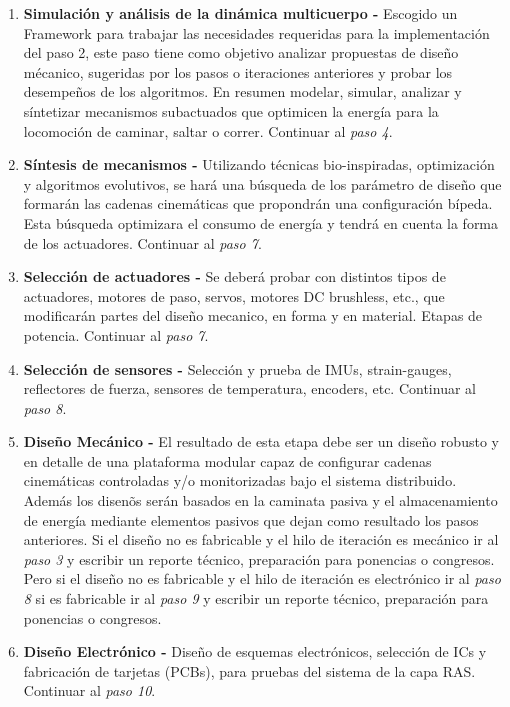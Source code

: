 {\begin{enumerate}
  \item \textbf{Simulaci\'on y an\'alisis de la din\'amica multicuerpo - } Escogido un Framework para trabajar las necesidades requeridas para la implementaci\'on del paso 2, este paso tiene como objetivo analizar propuestas de dise\~no m\'ecanico, sugeridas por los pasos o iteraciones anteriores y probar los desempe\~nos de los algoritmos. En resumen modelar, simular, analizar y s\'intetizar mecanismos subactuados que optimicen la energ\'ia para la locomoci\'on de caminar, saltar o correr. Continuar al \emph{paso 4}.\par
  \item \textbf{S\'intesis de mecanismos - } Utilizando t\'ecnicas bio-inspiradas, optimizaci\'on y algoritmos evolutivos, se har\'a una b\'usqueda de los parámetro de dise\~no que formar\'an las cadenas cinem\'aticas que propondrán una configuraci\'on b\'ipeda. Esta búsqueda optimizara el consumo de energ\'ia y tendrá en cuenta la forma de los actuadores. Continuar al \emph{paso 7}.\par
  \item \textbf{Selecci\'on de actuadores - } Se deber\'a probar con distintos tipos de actuadores, motores de paso, servos, motores DC brushless, etc., que modificar\'an partes del dise\~no mecanico, en forma y en material. Etapas de potencia. Continuar al \emph{paso 7}.\par
  \item \textbf{Selecci\'on de sensores - } Selecci\'on y prueba de IMUs, strain-gauges, reflectores de fuerza, sensores de temperatura, encoders, etc. Continuar al \emph{paso 8}.\par
  \item \textbf{Dise\~no Mec\'anico - } El resultado de esta etapa debe ser un dise\~no robusto y en detalle de una plataforma modular capaz de configurar cadenas cinem\'aticas controladas y/o monitorizadas bajo el sistema distribuido. Adem\'as los disen\~os ser\'an basados en la caminata pasiva y el almacenamiento de energ\'ia mediante elementos pasivos que dejan como resultado los pasos anteriores. Si el dise\~no no es fabricable y el hilo de iteraci\'on es mec\'anico ir al \emph{paso 3} y escribir un reporte t\'ecnico, preparaci\'on para ponencias o congresos. Pero si el dise\~no no es fabricable y el hilo de iteraci\'on es electr\'onico ir al \emph{paso 8} si es fabricable ir al \emph{paso 9} y escribir un reporte t\'ecnico, preparaci\'on para ponencias o congresos.\par
  \item \textbf{Dise\~no Electr\'onico - } Dise\~no de esquemas electrónicos, selección de ICs y fabricaci\'on de tarjetas (PCBs), para pruebas del sistema de la capa RAS. Continuar al \emph{paso 10}.\par

\end{enumerate}}
